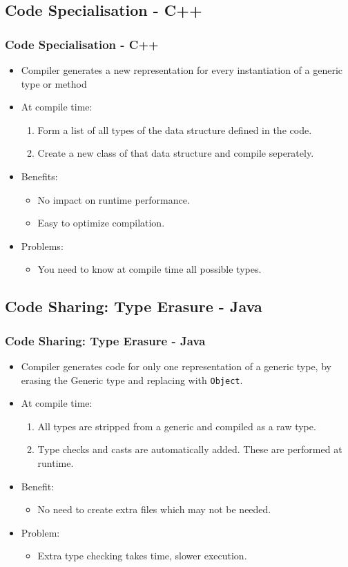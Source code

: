 \documentclass{beamer}
\begin{document}
\subsection{Code Specialisation - C++}
\begin{frame}
\frametitle{Code Specialisation - C++}
\begin{itemize}
\item Compiler generates a new representation for every instantiation of a generic type or method
\item At compile time:
\begin{enumerate}
\item Form a list of all types of the data structure defined in the code.
\item Create a new class of that data structure and compile seperately.
\end{enumerate}
\item {\color{green} Benefits:}
\begin{itemize}
\item No impact on runtime performance.
\item Easy to optimize compilation.
\end{itemize}
\item {\color{red} Problems:}
\begin{itemize}
\item You need to know at compile time all possible types.
\end{itemize}
\end{itemize}
\end{frame}
\subsection{Code Sharing: Type Erasure - Java}
\begin{frame}
\frametitle{Code Sharing: Type Erasure - Java}
\begin{itemize}
\item Compiler generates code for only one representation of a generic type, by {\color{orange}erasing} the Generic type and replacing with \texttt{Object}.
\item At compile time:
\begin{enumerate}
\item All types are stripped from a generic and compiled as a {\color{purple} raw type}.
\item {\color{magenta}Type checks and casts} are automatically added. These are performed at runtime.
\end{enumerate}
\item {\color{green} Benefit:}
\begin{itemize}
\item No need to create extra files which may not be needed.
\end{itemize}
\item {\color{red} Problem: }
\begin{itemize}
\item Extra type checking takes time, slower execution.
\end{itemize}
\end{itemize}
\end{frame}
\end{document}
